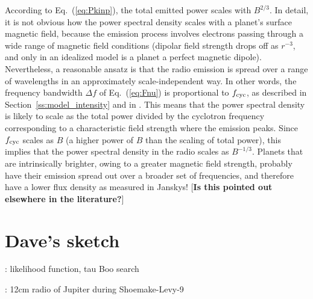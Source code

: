 \documentclass{emulateapj}
\def\memoDS#1{\color{blue}$[${\bf #1}$]$ \color{black}}
\begin{document}
According to Eq.~(\ref{eq:Pkinp}), the total emitted power scales with $B^{2/3}$.
In detail, it is not obvious how the power spectral density scales with a planet's surface magnetic field, because the emission process involves electrons passing through a wide range of magnetic field conditions (dipolar field strength drops off as $r^{-3}$, and only in an idealized model is a planet a perfect magnetic dipole).
Nevertheless, a reasonable ansatz is that the radio emission is spread over a range of wavelengths in an approximately scale-independent way.
In other words, the frequency bandwidth $\Delta f$ of Eq.~(\ref{eq:Fnu}) is proportional to $f_{\rm cyc}$, as described in Section~\ref{ss:model_intensity} and in \citet{griesmeier2007b}.
This means that the power spectral density is likely to scale as the total power divided by the cyclotron frequency corresponding to a characteristic field strength where the emission peaks.
Since $f_{\rm cyc}$ scales as $B$ (a higher power of $B$ than the scaling of total power), this implies that the power spectral density in the radio scales as $B^{-1/3}$.
Planets that are intrinsically brighter, owing to a greater magnetic field strength, probably have their emission spread out over a broader set of frequencies, and therefore have a lower flux density as measured in Janskys!
\memoDS{Is this pointed out elsewhere in the literature?}



\section{Dave's sketch}

\citep{spiegel2008}

\citep{lecavelier_et_al2013}

\citep{janhunen_et_al2003}

\citep{zarka1992, zarka1998}

\citep{farrell_et_al2004}

\citep{lazio+farrell2007}: likelihood function, tau Boo search

\citep{lecavelier_et_al2009}

\citep{spiegel2012}

\citep{nordhaus+spiegel2013}



\citep{jiang+jin1996}: 12cm radio of Jupiter during Shoemake-Levy-9

\citep{morin2012, morin_et_al2013}

\citep{christensen_et_al2009, christensen2010}
\end{document}
